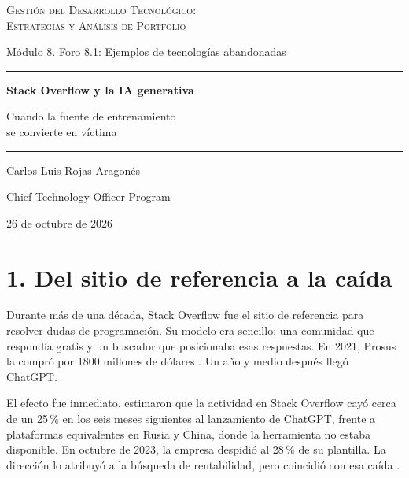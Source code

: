 \documentclass[11pt,letterpaper]{article}
\begin{document}
\begin{titlepage}
\centering
\vspace*{3.2cm}
{\large\scshape Gestión del Desarrollo Tecnológico:\\
Estrategias y Análisis de Portfolio\par}
\vspace{0.5cm}
{\normalsize Módulo 8. Foro 8.1: Ejemplos de tecnologías abandonadas\par}
\vspace{2.6cm}
{\color{cEje}\rule{0.55\textwidth}{0.8pt}\par}
\vspace{0.7cm}
{\LARGE\bfseries Stack Overflow y la IA generativa\par}
\vspace{0.5cm}
{\large Cuando la fuente de entrenamiento\\
se convierte en víctima\par}
\vspace{0.7cm}
{\color{cEje}\rule{0.55\textwidth}{0.8pt}\par}
\vfill
{\large Carlos Luis Rojas Aragonés\par}
\vspace{0.3cm}
{\normalsize Chief Technology Officer Program\par}
\vspace{0.3cm}
{\normalsize 26 de octubre de 2026\par}
\vspace*{1.5cm}
\end{titlepage}

\section*{1. Del sitio de referencia a la caída}

Durante más de una década, Stack Overflow fue el sitio de referencia para
resolver dudas de programación. Su modelo era sencillo: una comunidad que
respondía gratis y un buscador que posicionaba esas respuestas. En 2021, Prosus
la compró por 1800 millones de dólares \parencite{stackoverflow2021}. Un año y
medio después llegó ChatGPT.

El efecto fue inmediato. \Textcite{delriochanona2024} estimaron que la actividad
en Stack Overflow cayó cerca de un 25\,\% en los seis meses siguientes al
lanzamiento de ChatGPT, frente a plataformas equivalentes en Rusia y China,
donde la herramienta no estaba disponible. En octubre de 2023, la empresa
despidió al 28\,\% de su plantilla. La dirección lo atribuyó a la búsqueda de
rentabilidad, pero coincidió con esa caída \parencite{chandrasekar2023}.
\end{document}
